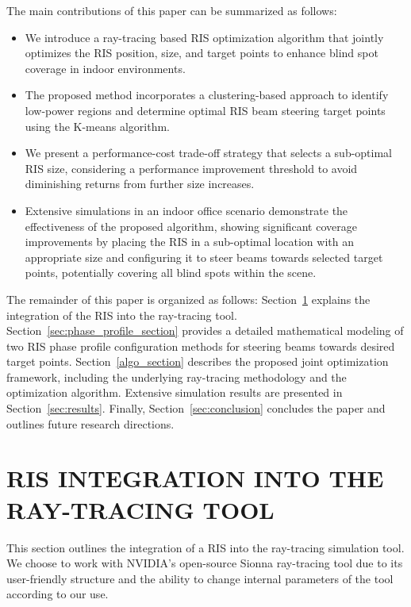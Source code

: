 \documentclass{IEEEoj}
\begin{document}
The main contributions of this paper can be summarized as follows:
\begin{itemize}
	\item We introduce a ray-tracing based RIS optimization algorithm that jointly optimizes the RIS position, size, and target points to enhance blind spot coverage in indoor environments.
	\item The proposed method incorporates a clustering-based approach to identify low-power regions and determine optimal RIS beam steering target points using the K-means algorithm.
	\item We present a performance-cost trade-off strategy that selects a sub-optimal RIS size, considering a performance improvement threshold to avoid diminishing returns from further size increases.
	\item Extensive simulations in an indoor office scenario demonstrate the effectiveness of the proposed algorithm, showing significant coverage improvements by placing the RIS in a sub-optimal location with an appropriate size and configuring it to steer beams towards selected target points, potentially covering all blind spots within the scene.
\end{itemize}

The remainder of this paper is organized as follows: Section~\ref{sec:ris_integration_into_RT} explains the integration of the RIS into the ray-tracing tool. Section~\ref{sec:phase_profile_section} provides a detailed mathematical modeling of two RIS phase profile configuration methods for steering beams towards desired target points. Section~\ref{algo_section} describes the proposed joint optimization framework, including the underlying ray-tracing methodology and the optimization algorithm. Extensive simulation results are presented in Section~\ref{sec:results}. Finally, Section~\ref{sec:conclusion} concludes the paper and outlines future research directions.

\section{RIS INTEGRATION INTO THE RAY-TRACING TOOL} \label{sec:ris_integration_into_RT}
This section outlines the integration of a RIS into the ray-tracing simulation tool. We choose to work with NVIDIA's open-source Sionna ray-tracing tool \cite{sionna} due to its user-friendly structure and the ability to change internal parameters of the tool according to our use.
\end{document}
